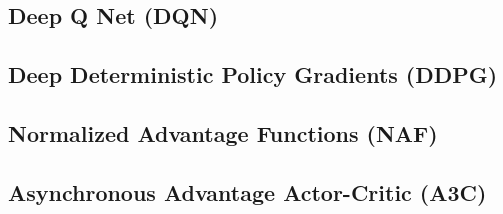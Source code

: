 \documentclass[journal]{IEEEtran}
\begin{document}
\subsection{Deep Q Net (DQN)}

\subsection{Deep Deterministic Policy Gradients (DDPG)}

\subsection{Normalized Advantage Functions (NAF)}

\subsection{Asynchronous Advantage Actor-Critic (A3C)}
\end{document}
